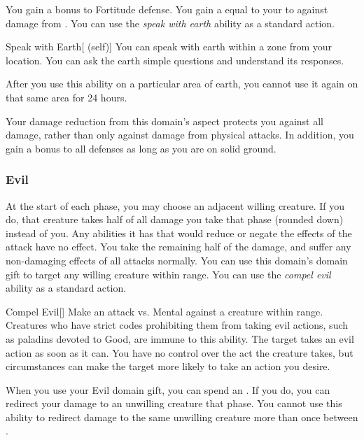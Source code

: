              You gain a  bonus to Fortitude defense.
             You gain a  equal to your  to  against damage from .
             You can use the \textit{speak with earth} ability as a standard action.
            \begin{attuneability}{Speak with Earth}[ (self)]
                You can speak with earth within a \areahuge zone from your location.
                You can ask the earth simple questions and understand its responses.

                After you use this ability on a particular area of earth, you cannot use it again on that same area for 24 hours.
            \end{attuneability}
             Your damage reduction from this domain's aspect protects you against all damage, rather than only against damage from physical attacks.
            In addition, you gain a  bonus to all defenses as long as you are on solid ground.

        \subsubsection{Evil}
             At the start of each phase, you may choose an adjacent willing creature.
            If you do, that creature takes half of all damage you take that phase (rounded down) instead of you.
            Any abilities it has that would reduce or negate the effects of the attack have no effect.
            You take the remaining half of the damage, and suffer any non-damaging effects of all attacks normally.
             You can use this domain's domain gift to target any willing creature within \rngclose range.
             You can use the \textit{compel evil} ability as a standard action.
            \begin{apability}{Compel Evil}[]
                Make an attack vs. Mental against a creature within \rngmed range.
                Creatures who have strict codes prohibiting them from taking evil actions, such as paladins devoted to Good, are immune to this ability.
                \hit The target takes an evil action as soon as it can.
                You have no control over the act the creature takes, but circumstances can make the target more likely to take an action you desire.
            \end{apability}
             When you use your Evil domain gift, you can spend an .
            If you do, you can redirect your damage to an unwilling creature that phase.
            You cannot use this ability to redirect damage to the same unwilling creature more than once between .

